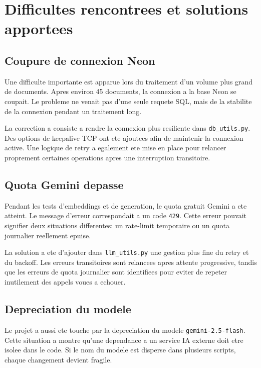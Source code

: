 \chapter{Difficultes rencontrees et solutions apportees}
\label{chap:difficultes}

\section{Coupure de connexion Neon}

Une difficulte importante est apparue lors du traitement d'un volume plus grand de documents. Apres environ 45 documents, la connexion a la base Neon se coupait. Le probleme ne venait pas d'une seule requete SQL, mais de la stabilite de la connexion pendant un traitement long.

La correction a consiste a rendre la connexion plus resiliente dans \texttt{db\_utils.py}. Des options de keepalive TCP ont ete ajoutees afin de maintenir la connexion active. Une logique de retry a egalement ete mise en place pour relancer proprement certaines operations apres une interruption transitoire.

\section{Quota Gemini depasse}

Pendant les tests d'embeddings et de generation, le quota gratuit Gemini a ete atteint. Le message d'erreur correspondait a un code \texttt{429}. Cette erreur pouvait signifier deux situations differentes: un rate-limit temporaire ou un quota journalier reellement epuise.

La solution a ete d'ajouter dans \texttt{llm\_utils.py} une gestion plus fine du retry et du backoff. Les erreurs transitoires sont relancees apres attente progressive, tandis que les erreurs de quota journalier sont identifiees pour eviter de repeter inutilement des appels voues a echouer.

\section{Depreciation du modele}

Le projet a aussi ete touche par la depreciation du modele \texttt{gemini-2.5-flash}. Cette situation a montre qu'une dependance a un service IA externe doit etre isolee dans le code. Si le nom du modele est disperse dans plusieurs scripts, chaque changement devient fragile.

